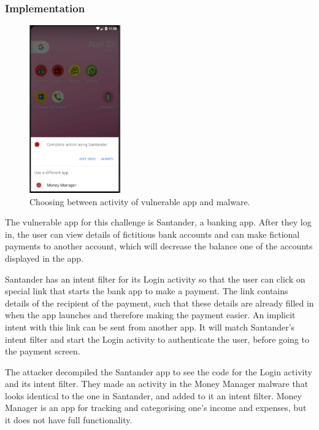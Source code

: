     \subsubsection{Implementation}
        \label{subsubsec:activity_hijack_implementation}
        
    \begin{figure}
        \centering
        \includegraphics[width=0.35\textwidth]{graphics/activity_hijack.PNG}
        \caption{Choosing between activity of vulnerable app and malware.}
        \label{fig:activity_hijack}
    \end{figure}
        
    The vulnerable app for this challenge is Santander, a banking app. After they log in, the user can view details of fictitious bank accounts and can make fictional payments to another account, which will decrease the balance one of the accounts displayed in the app.
    
    Santander has an intent filter for its Login activity so that the user can click on special link that starts the bank app to make a payment. The link contains details of the recipient of the payment, such that these details are already filled in when the app launches and therefore making the payment easier. An implicit intent with this link can be sent from another app. It will match Santander's intent filter and start the Login activity to authenticate the user, before going to the payment screen.

    The attacker decompiled the Santander app to see the code for the Login activity and its intent filter. They made an activity in the Money Manager malware that looks identical to the one in Santander, and added to it an intent filter. Money Manager is an app for tracking and categorising one's income and expenses, but it does not have full functionality.
    

